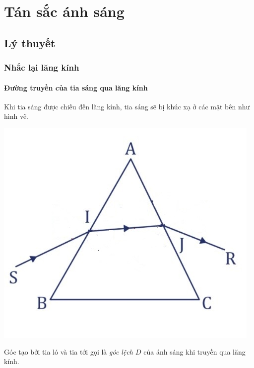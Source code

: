 
\chapter[Tán sắc ánh sáng]{Tán sắc ánh sáng}
\section{Lý thuyết}

\subsection{Nhắc lại lăng kính}
\subsubsection{Đường truyền của tia sáng qua lăng kính}
Khi tia sáng được chiếu đến lăng kính, tia sáng sẽ bị khúc xạ ở các mặt bên như hình vẽ. 
\begin{center}
	\includegraphics[scale=0.4]{../figs/VN12-PH-32-L-019-1-1.jpg}
\end{center}

Góc tạo bởi tia ló và tia tới gọi là \textit{góc lệch $D$} của ánh sáng khi truyền qua lăng kính.
